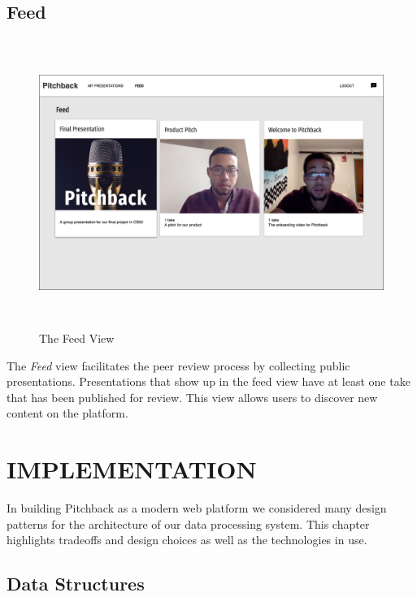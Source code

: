 \subsection*{Feed}

\begin{figure}[H]
  \centering
   \includegraphics[height=3.7in]{figures/feed}
   \caption{The Feed View}
\end{figure}

The \textit{Feed} view facilitates the peer review process by collecting public
presentations. Presentations that show up in the feed view have at least one
take that has been published for review. This view allows users to discover new
content on the platform.

\section*{IMPLEMENTATION} \label{chapterimplementation}

In building Pitchback as a modern web platform we considered many design
patterns for the architecture of our data processing system. This chapter
highlights tradeoffs and design choices as well as the technologies in use.

\subsection*{Data Structures}

